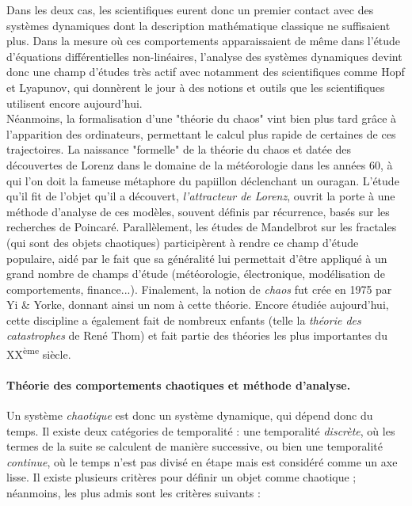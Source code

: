 \documentclass[12pt,a4paper]{article}
\begin{document}
Dans les deux cas, les scientifiques eurent donc un premier contact avec des systèmes dynamiques dont la description mathématique classique ne suffisaient plus. Dans la mesure où ces comportements apparaissaient de même dans l'étude d'équations différentielles non-linéaires, l'analyse des systèmes dynamiques devint donc une champ d'études très actif avec notamment des scientifiques comme Hopf et Lyapunov, qui donnèrent le jour à des notions et outils que les scientifiques utilisent encore aujourd'hui.\\

Néanmoins, la formalisation d'une "théorie du chaos" vint bien plus tard grâce à l'apparition des ordinateurs, permettant le calcul plus rapide de certaines de ces trajectoires. La naissance "formelle" de la théorie du chaos et datée des découvertes de Lorenz dans le domaine de la météorologie dans les années 60, à qui l'on doit la fameuse métaphore du papiillon déclenchant un ouragan. L'étude qu'il fit de l'objet qu'il a découvert, \textit{l'attracteur de Lorenz}, ouvrit la porte à une méthode d'analyse de ces modèles, souvent définis par récurrence, basés sur les recherches de Poincaré. Parallèlement, les études de Mandelbrot sur les fractales (qui sont des objets chaotiques) participèrent à rendre ce champ d'étude populaire, aidé par le fait que sa généralité lui permettait d'être appliqué à un grand nombre de champs d'étude (météorologie, électronique, modélisation de comportements, finance...). Finalement, la notion de \textit{chaos} fut crée en 1975 par Yi \& Yorke, donnant ainsi un nom à cette théorie. Encore étudiée aujourd'hui, cette discipline a également fait de nombreux enfants (telle la \textit{théorie des catastrophes} de René Thom) et fait partie des théories les plus importantes du XX\textsuperscript{ème} siècle.


\paragraph{Théorie des comportements chaotiques et méthode d'analyse.}
Un système \textit{chaotique} est donc un système dynamique, qui dépend donc du temps. Il existe deux catégories de temporalité : une temporalité \textit{discrète}, où les termes de la suite se calculent de manière successive, ou bien une temporalité \textit{continue}, où le temps n'est pas divisé en étape mais est considéré comme un axe lisse. Il existe plusieurs critères pour définir un objet comme chaotique ;  néanmoins, les plus admis sont les critères suivants :\\
\end{document}
